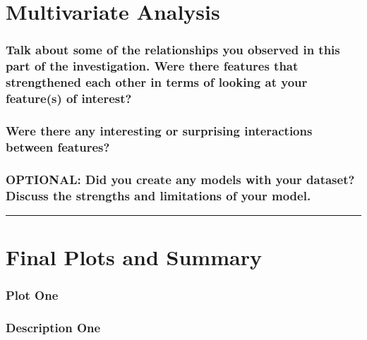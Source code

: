 \documentclass[]{article}
\begin{document}
\section{Multivariate Analysis}\label{multivariate-analysis}

\subsubsection{Talk about some of the relationships you observed in this
part of the investigation. Were there features that strengthened each
other in terms of looking at your feature(s) of
interest?}\label{talk-about-some-of-the-relationships-you-observed-in-this-part-of-the-investigation.-were-there-features-that-strengthened-each-other-in-terms-of-looking-at-your-features-of-interest}

\subsubsection{Were there any interesting or surprising interactions
between
features?}\label{were-there-any-interesting-or-surprising-interactions-between-features}

\subsubsection{OPTIONAL: Did you create any models with your dataset?
Discuss the strengths and limitations of your
model.}\label{optional-did-you-create-any-models-with-your-dataset-discuss-the-strengths-and-limitations-of-your-model.}

\begin{center}\rule{0.5\linewidth}{\linethickness}\end{center}

\section{Final Plots and Summary}\label{final-plots-and-summary}

\subsubsection{Plot One}\label{plot-one}

\subsubsection{Description One}\label{description-one}
\end{document}
